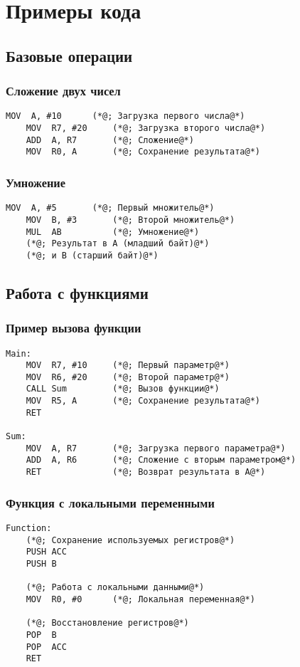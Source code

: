 \documentclass[a4paper, 12pt]{article}
\begin{document}
\section{Примеры кода}
\subsection{Базовые операции}
\subsubsection{Сложение двух чисел}
\begin{lstlisting}[language={mc51}]
    MOV  A, #10      (*@; Загрузка первого числа@*)
    MOV  R7, #20     (*@; Загрузка второго числа@*)
    ADD  A, R7       (*@; Сложение@*)
    MOV  R0, A       (*@; Сохранение результата@*)
\end{lstlisting}

\subsubsection{Умножение}
\begin{lstlisting}[language={mc51}]
    MOV  A, #5       (*@; Первый множитель@*)
    MOV  B, #3       (*@; Второй множитель@*)
    MUL  AB          (*@; Умножение@*)
    (*@; Результат в A (младший байт)@*)
    (*@; и B (старший байт)@*)
\end{lstlisting}

\subsection{Работа с функциями}
\subsubsection{Пример вызова функции}
\begin{lstlisting}[language={mc51}]
Main:
    MOV  R7, #10     (*@; Первый параметр@*)
    MOV  R6, #20     (*@; Второй параметр@*)
    CALL Sum         (*@; Вызов функции@*)
    MOV  R5, A       (*@; Сохранение результата@*)
    RET

Sum:
    MOV  A, R7       (*@; Загрузка первого параметра@*)
    ADD  A, R6       (*@; Сложение с вторым параметром@*)
    RET              (*@; Возврат результата в A@*)
\end{lstlisting}

\subsubsection{Функция с локальными переменными}
\begin{lstlisting}[language={mc51}]
Function:
    (*@; Сохранение используемых регистров@*)
    PUSH ACC
    PUSH B
    
    (*@; Работа с локальными данными@*)
    MOV  R0, #0      (*@; Локальная переменная@*)
    
    (*@; Восстановление регистров@*)
    POP  B
    POP  ACC
    RET
\end{lstlisting}
\end{document}
